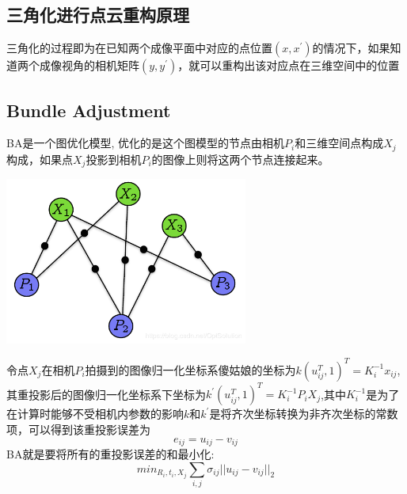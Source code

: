 \subsection{三角化进行点云重构原理}
三角化的过程即为在已知两个成像平面中对应的点位置$(x,x^\prime)$的情况下，如果知道两个成像视角的相机矩阵$(y,y^\prime)$，就可以重构出该对应点在三维空间中的位置

\subsection{Bundle Adjustment}
BA是一个图优化模型, 优化的是这个图模型的节点由相机$P_i$和三维空间点构成$X_j$构成，如果点$X_j$投影到相机$P_i$的图像上则将这两个节点连接起来。

\begin{center}
    \includegraphics[width=0.6\textwidth]{figures/BA.png}
\end{center}


令点$X_j$在相机$P_i$拍摄到的图像归一化坐标系傻姑娘的坐标为$k(u_{ij}^T,1)^T = K_i^{-1}x_{ij}$, 其重投影后的图像归一化坐标系下坐标为$k^\prime(u_{ij}^T,1)^T=K_i^{-1}P_iX_j$,其中$K_i^{-1}$是为了在计算时能够不受相机内参数的影响$k$和$k^\prime$是将齐次坐标转换为非齐次坐标的常数项，可以得到该重投影误差为
$$
e_{ij} = u_{ij}-v_{ij}
$$
BA就是要将所有的重投影误差的和最小化:
$$
min_{R_i,t_i,X_j}\sum_{i,j}\sigma_{ij}\vert\vert u_{ij}-v_{ij}\vert\vert_2
$$